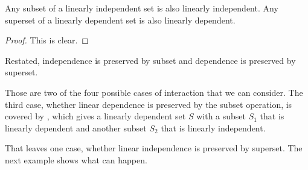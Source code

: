 \begin{lemma}  \label{le:SubsetPreserveLI}
Any subset of a linearly independent set is also linearly independent.
Any superset of a linearly dependent set is also linearly dependent.
\end{lemma}

\begin{proof}
This is clear.
\end{proof}

Restated, independence is preserved by subset 
and dependence is preserved by superset.

Those are two of the four possible cases of interaction that we can consider.
The third case, whether linear dependence is preserved by the subset operation,
is covered by , which gives
a linearly dependent set $S$ with a subset $S_1$ 
that is linearly dependent and another subset $S_2$
that is linearly independent.

That leaves one case, whether linear independence is preserved by superset.
The next example shows what can happen.

